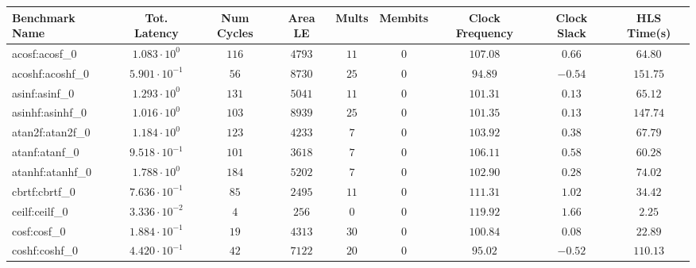\begin{tabular}{|l|c|c|c|c|c|c|c|c|}
\hline
Benchmark Name               & Tot. Latency            & Num Cycles & Area LE    & Mults   & Membits & Clock Frequency & Clock Slack & HLS Time(s) \\
\hline
acosf:acosf\_0               & $ 1.083 \cdot 10^{0}  $ & $ 116    $ & $ 4793   $ & $ 11  $ & $ 0   $ & $ 107.08      $ & $ 0.66    $ & $ 64.80   $ \\
acoshf:acoshf\_0             & $ 5.901 \cdot 10^{-1} $ & $ 56     $ & $ 8730   $ & $ 25  $ & $ 0   $ & $ 94.89       $ & $ -0.54   $ & $ 151.75  $ \\
asinf:asinf\_0               & $ 1.293 \cdot 10^{0}  $ & $ 131    $ & $ 5041   $ & $ 11  $ & $ 0   $ & $ 101.31      $ & $ 0.13    $ & $ 65.12   $ \\
asinhf:asinhf\_0             & $ 1.016 \cdot 10^{0}  $ & $ 103    $ & $ 8939   $ & $ 25  $ & $ 0   $ & $ 101.35      $ & $ 0.13    $ & $ 147.74  $ \\
atan2f:atan2f\_0             & $ 1.184 \cdot 10^{0}  $ & $ 123    $ & $ 4233   $ & $ 7   $ & $ 0   $ & $ 103.92      $ & $ 0.38    $ & $ 67.79   $ \\
atanf:atanf\_0               & $ 9.518 \cdot 10^{-1} $ & $ 101    $ & $ 3618   $ & $ 7   $ & $ 0   $ & $ 106.11      $ & $ 0.58    $ & $ 60.28   $ \\
atanhf:atanhf\_0             & $ 1.788 \cdot 10^{0}  $ & $ 184    $ & $ 5202   $ & $ 7   $ & $ 0   $ & $ 102.90      $ & $ 0.28    $ & $ 74.02   $ \\
cbrtf:cbrtf\_0               & $ 7.636 \cdot 10^{-1} $ & $ 85     $ & $ 2495   $ & $ 11  $ & $ 0   $ & $ 111.31      $ & $ 1.02    $ & $ 34.42   $ \\
ceilf:ceilf\_0               & $ 3.336 \cdot 10^{-2} $ & $ 4      $ & $ 256    $ & $ 0   $ & $ 0   $ & $ 119.92      $ & $ 1.66    $ & $ 2.25    $ \\
cosf:cosf\_0                 & $ 1.884 \cdot 10^{-1} $ & $ 19     $ & $ 4313   $ & $ 30  $ & $ 0   $ & $ 100.84      $ & $ 0.08    $ & $ 22.89   $ \\
coshf:coshf\_0               & $ 4.420 \cdot 10^{-1} $ & $ 42     $ & $ 7122   $ & $ 20  $ & $ 0   $ & $ 95.02       $ & $ -0.52   $ & $ 110.13  $ \\

\end{tabular}
